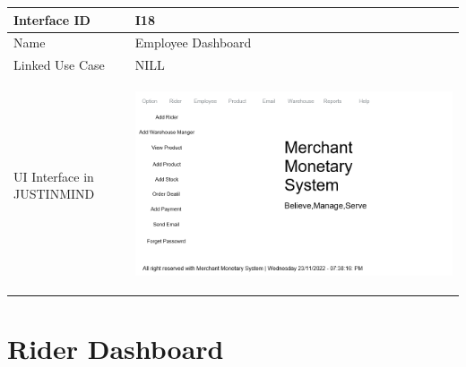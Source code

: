 \documentclass[12pt,a4paper]{report}
\begin{document}
\begin{tabular}{ | m{3cm} | m{12cm}| } \hline

Interface ID & I18  \\\hline

Name  &  Employee Dashboard \\ \hline

Linked Use Case &  NILL \\ \hline

UI Interface in JUSTINMIND & \begin{center} \includegraphics[scale=0.3]{./User Interface/UI-017 Employee Dashboard@1x.png}\end{center}  \\ \hline

\end{tabular} 
\section{Rider Dashboard }
\end{document}
